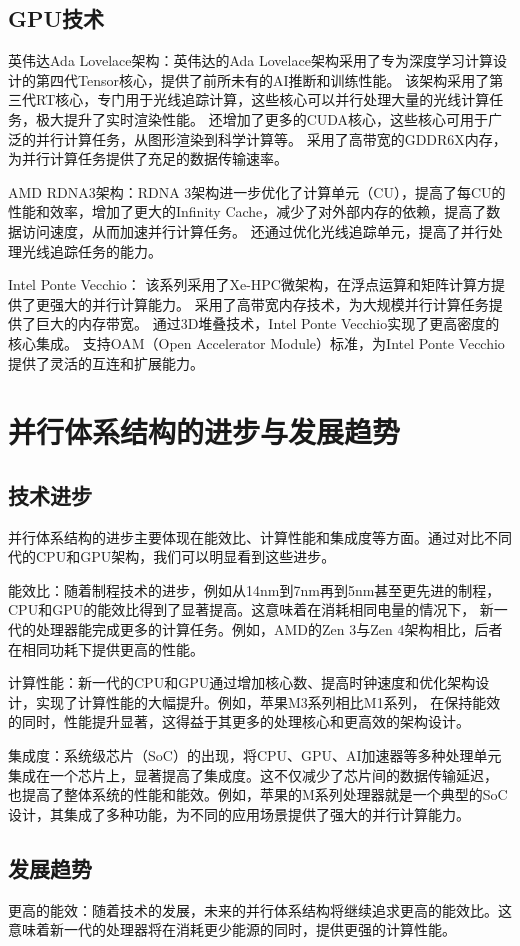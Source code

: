 \documentclass{ctexart}
\begin{document}
\subsection{GPU技术}
英伟达Ada Lovelace架构：英伟达的Ada Lovelace架构采用了专为深度学习计算设计的第四代Tensor核心，提供了前所未有的AI推断和训练性能。
该架构采用了第三代RT核心，专门用于光线追踪计算，这些核心可以并行处理大量的光线计算任务，极大提升了实时渲染性能。
还增加了更多的CUDA核心，这些核心可用于广泛的并行计算任务，从图形渲染到科学计算等。
采用了高带宽的GDDR6X内存，为并行计算任务提供了充足的数据传输速率。
\cite{nvidiaOfficial}

AMD RDNA3架构：RDNA 3架构进一步优化了计算单元（CU），提高了每CU的性能和效率，增加了更大的Infinity Cache，减少了对外部内存的依赖，提高了数据访问速度，从而加速并行计算任务。
还通过优化光线追踪单元，提高了并行处理光线追踪任务的能力。
\cite{amdOfficial}

Intel Ponte Vecchio：
该系列采用了Xe-HPC微架构，在浮点运算和矩阵计算方提供了更强大的并行计算能力。
采用了高带宽内存技术，为大规模并行计算任务提供了巨大的内存带宽。
通过3D堆叠技术，Intel Ponte Vecchio实现了更高密度的核心集成。
支持OAM（Open Accelerator Module）标准，为Intel Ponte Vecchio提供了灵活的互连和扩展能力。
\cite{intelOfficial}
\section{并行体系结构的进步与发展趋势}
\subsection{技术进步}
并行体系结构的进步主要体现在能效比、计算性能和集成度等方面。通过对比不同代的CPU和GPU架构，我们可以明显看到这些进步。

能效比：随着制程技术的进步，例如从14nm到7nm再到5nm甚至更先进的制程，CPU和GPU的能效比得到了显著提高。这意味着在消耗相同电量的情况下，
新一代的处理器能完成更多的计算任务。例如，AMD的Zen 3与Zen 4架构相比，后者在相同功耗下提供更高的性能。

计算性能：新一代的CPU和GPU通过增加核心数、提高时钟速度和优化架构设计，实现了计算性能的大幅提升。例如，苹果M3系列相比M1系列，
在保持能效的同时，性能提升显著，这得益于其更多的处理核心和更高效的架构设计。

集成度：系统级芯片（SoC）的出现，将CPU、GPU、AI加速器等多种处理单元集成在一个芯片上，显著提高了集成度。这不仅减少了芯片间的数据传输延迟，
也提高了整体系统的性能和能效。例如，苹果的M系列处理器就是一个典型的SoC设计，其集成了多种功能，为不同的应用场景提供了强大的并行计算能力。
\subsection{发展趋势}
更高的能效：随着技术的发展，未来的并行体系结构将继续追求更高的能效比。这意味着新一代的处理器将在消耗更少能源的同时，提供更强的计算性能。
\end{document}
